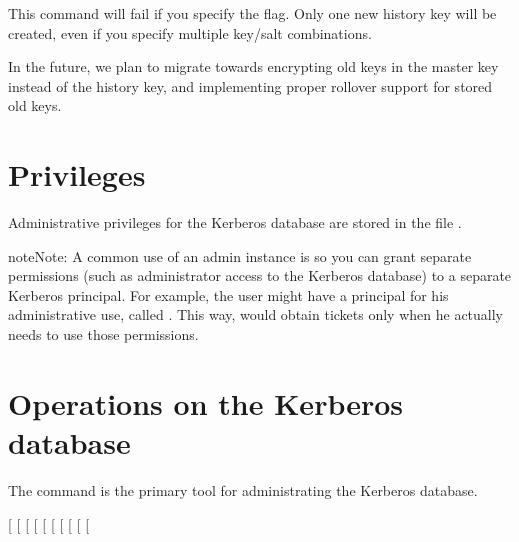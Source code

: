 \documentclass[letterpaper,10pt,english]{sphinxmanual}
\begin{document}
%
\begin{sphinxVerbatim}[commandchars=\\\{\}]
   
\end{sphinxVerbatim}

This command will fail if you specify the  flag.  Only one
new history key will be created, even if you specify multiple key/salt
combinations.

In the future, we plan to migrate towards encrypting old keys in the
master key instead of the history key, and implementing proper
rollover support for stored old keys.


\section{Privileges}
\label{\detokenize{admin/database:privileges}}\label{\detokenize{admin/database:id2}}
Administrative privileges for the Kerberos database are stored in the
file {\hyperref[\detokenize{admin/conf_files/kadm5_acl:kadm5-acl-5}]{}}.

\begin{sphinxadmonition}{note}{Note:}
A common use of an admin instance is so you can grant
separate permissions (such as administrator access to the
Kerberos database) to a separate Kerberos principal. For
example, the user  might have a principal for
his administrative use, called .  This
way,  would obtain  tickets
only when he actually needs to use those permissions.
\end{sphinxadmonition}


\section{Operations on the Kerberos database}
\label{\detokenize{admin/database:db-operations}}\label{\detokenize{admin/database:operations-on-the-kerberos-database}}
The {\hyperref[\detokenize{admin/admin_commands/kdb5_util:kdb5-util-8}]{}} command is the primary tool for administrating
the Kerberos database.

{[} \sphinxstyleemphasis{realm}{]}
{[} \sphinxstyleemphasis{dbname}{]}
{[} \sphinxstyleemphasis{mkeytype}{]}
{[} \sphinxstyleemphasis{mkeyVNO}{]}
{[} \sphinxstyleemphasis{mkeyname}{]}
{[}\sphinxstylestrong{-m}{]}
{[} \sphinxstyleemphasis{stashfilename}{]}
{[} \sphinxstyleemphasis{password}{]}
{[} \sphinxstyleemphasis{db\_args}{]}
 {[}\sphinxstyleemphasis{command\_options}{]}
\end{document}
